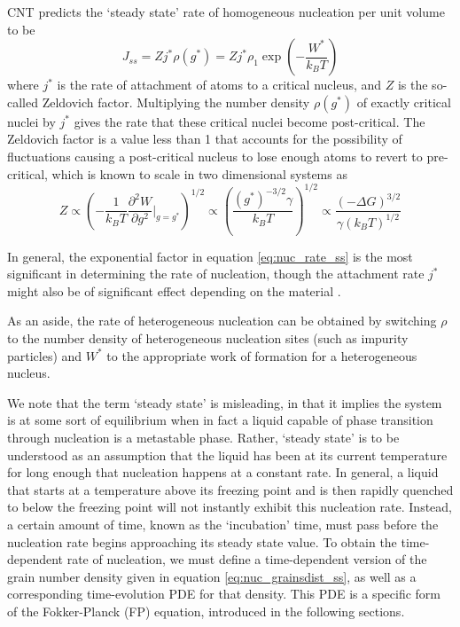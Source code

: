 CNT predicts the `steady state' rate of homogeneous nucleation per unit volume to be \cite{hoyt_phasetransf}
\begin{equation}\label{eq:nuc_rate_ss}
J_{ss} = Zj^*\rho(g^*)= Zj^* \rho_1\exp\left(-\frac{W^*}{k_B T}\right)
\end{equation}
where $j^*$ is the rate of attachment of atoms to a critical nucleus, and $Z$ is the so-called Zeldovich factor. Multiplying the number density $\rho(g^*)$ of exactly critical nuclei by $j^*$ gives the rate that these critical nuclei become post-critical. The Zeldovich factor is a value less than 1 that accounts for the possibility of fluctuations causing a post-critical nucleus to lose enough atoms to revert to pre-critical, which is known to scale in two dimensional systems as
\begin{equation}\label{eq:nuc_Z_scaling}
Z \propto \left(-\frac{1}{k_B T}\frac{\partial^2 W}{\partial g^2}\Bigr|_{g=g^*}\right)^{1/2} \propto \left(\frac{(g^*)^{-3/2}\gamma}{k_B T}\right)^{1/2} \propto \frac{(-\Delta G)^{3/2}}{\gamma  (k_B T)^{1/2}}
\end{equation}

In general, the exponential factor in equation \ref{eq:nuc_rate_ss} is the most significant in determining the rate of nucleation, though the attachment rate $j^*$ might also be of significant effect depending on the material \cite{hoyt_phasetransf}.

As an aside, the rate of heterogeneous nucleation can be obtained by switching $\rho$ to the number density of heterogeneous nucleation sites (such as impurity particles) and $W^*$ to the appropriate work of formation for a heterogeneous nucleus.

We note that the term `steady state' is misleading, in that it implies the system is at some sort of equilibrium when in fact a liquid capable of phase transition through nucleation is a metastable phase. Rather, `steady state' is to be understood as an assumption that the liquid has been at its current temperature for long enough that nucleation happens at a constant rate. In general, a liquid that starts at a temperature above its freezing point and is then rapidly quenched to below the freezing point will not instantly exhibit this nucleation rate. Instead, a certain amount of time, known as the `incubation' time, must pass before the nucleation rate begins approaching its steady state value. To obtain the time-dependent rate of nucleation, we must define a time-dependent version of the grain number density given in equation \ref{eq:nuc_grainsdist_ss}, as well as a corresponding time-evolution PDE for that density. This PDE is a specific form of the Fokker-Planck (FP) equation, introduced in the following sections.

